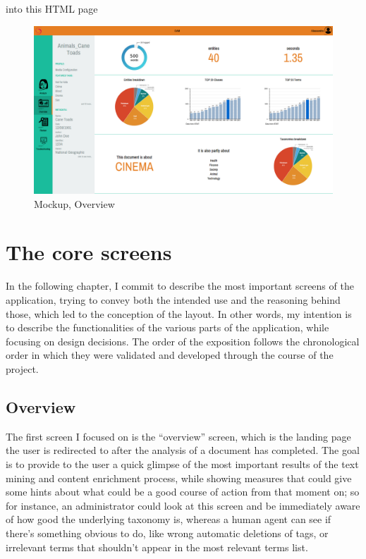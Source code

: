 \documentclass[12pt,svgnames]{memoir}
\begin{document}
into this HTML page

\begin{figure}[htbp]
\centering
\includegraphics{./src/img/mockup-overview.png}
\caption{Mockup, Overview}
\end{figure}

\chapter{The core screens}\label{the-core-screens}

In the following chapter, I commit to describe the most important
screens of the application, trying to convey both the intended use and
the reasoning behind those, which led to the conception of the layout.
In other words, my intention is to describe the functionalities of the
various parts of the application, while focusing on design decisions.
The order of the exposition follows the chronological order in which
they were validated and developed through the course of the project.

\section{Overview}\label{overview-1}

The first screen I focused on is the ``overview'' screen, which is the
landing page the user is redirected to after the analysis of a document
has completed. The goal is to provide to the user a quick glimpse of the
most important results of the text mining and content enrichment
process, while showing measures that could give some hints about what
could be a good course of action from that moment on; so for instance,
an administrator could look at this screen and be immediately aware of
how good the underlying taxonomy is, whereas a human agent can see if
there's something obvious to do, like wrong automatic deletions of tags,
or irrelevant terms that shouldn't appear in the most relevant terms
list.
\end{document}

